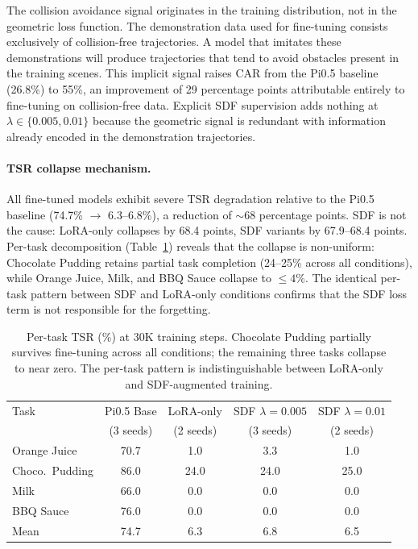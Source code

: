 The collision avoidance signal originates in the training distribution, not in the geometric loss function. The demonstration data used for fine-tuning consists exclusively of collision-free trajectories. A model that imitates these demonstrations will produce trajectories that tend to avoid obstacles present in the training scenes. This implicit signal raises CAR from the Pi0.5 baseline (26.8\%) to 55\%, an improvement of 29 percentage points attributable entirely to fine-tuning on collision-free data. Explicit SDF supervision adds nothing at $\lambda \in \{0.005, 0.01\}$ because the geometric signal is redundant with information already encoded in the demonstration trajectories.

\paragraph{TSR collapse mechanism.}
All fine-tuned models exhibit severe TSR degradation relative to the Pi0.5 baseline (74.7\% $\to$ 6.3--6.8\%), a reduction of ${\sim}$68 percentage points. SDF is not the cause: LoRA-only collapses by 68.4 points, SDF variants by 67.9--68.4 points. Per-task decomposition (Table~\ref{tab:per_task_tsr}) reveals that the collapse is non-uniform: Chocolate Pudding retains partial task completion (24--25\% across all conditions), while Orange Juice, Milk, and BBQ Sauce collapse to ${\leq}4$\%. The identical per-task pattern between SDF and LoRA-only conditions confirms that the SDF loss term is not responsible for the forgetting.

\begin{table}[t]
\centering
\caption{Per-task TSR (\%) at 30K training steps. Chocolate Pudding partially survives fine-tuning across all conditions; the remaining three tasks collapse to near zero. The per-task pattern is indistinguishable between LoRA-only and SDF-augmented training.}
\label{tab:per_task_tsr}
\vspace{2pt}
\small
\begin{tabular}{lcccc}
\toprule
Task & Pi0.5 Base & LoRA-only & SDF $\lambda{=}0.005$ & SDF $\lambda{=}0.01$ \\
 & (3 seeds) & (2 seeds) & (3 seeds) & (2 seeds) \\
\midrule
Orange Juice      & 70.7 & 1.0 & 3.3 & 1.0 \\
Choco.\ Pudding   & 86.0 & 24.0 & 24.0 & 25.0 \\
Milk              & 66.0 & 0.0 & 0.0 & 0.0 \\
BBQ Sauce         & 76.0 & 0.0 & 0.0 & 0.0 \\
\midrule
Mean              & 74.7 & 6.3 & 6.8 & 6.5 \\
\bottomrule
\end{tabular}
\end{table}

